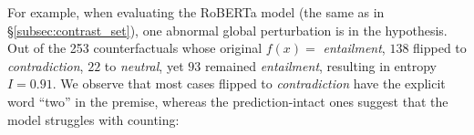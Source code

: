 For example, when evaluating the \nli RoBERTa model (the same as in \S\ref{subsec:contrast_set}), one abnormal global perturbation is  in the hypothesis.
Out of the 253 counterfactuals whose original $f(x)=$ \emph{entailment}, $138$ flipped to \emph{contradiction}, $22$ to \emph{neutral}, yet $93$ remained \emph{entailment}, resulting in entropy $I=0.91$.
We observe that most cases flipped to \emph{contradiction} have the explicit word ``two'' in the premise, whereas the prediction-intact ones suggest that the model struggles with counting:


